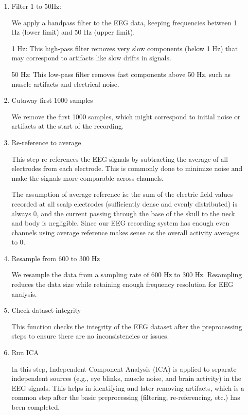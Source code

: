 \documentclass[12pt,a4paper,titlepage,openany]{report}
\begin{document}
\begin{enumerate}
    \item Filter 1 to 50Hz:
    
    We apply a bandpass filter to the EEG data, keeping frequencies between 1 Hz (lower limit) and 50 Hz (upper limit).

    1 Hz: This high-pass filter removes very slow components (below 1 Hz) that may correspond to artifacts like slow drifts in signals.

    50 Hz: This low-pass filter removes fast components above 50 Hz, such as muscle artifacts and electrical noise.

    \item Cutaway first 1000 samples

    We remove the first 1000 samples, which might correspond to initial noise or artifacts at the start of the recording. 

    \item Re-reference to average

    This step re-references the EEG signals by subtracting the average of all electrodes from each electrode. This is commonly done to minimize noise and make the signals more comparable across channels.

    The assumption of average reference is: the sum of the electric field values recorded at all scalp electrodes (sufficiently dense and evenly distributed) is always 0, and the current passing through the base of the skull to the neck and body is negligible. 
    Since our EEG recording system has enough even channels using average reference makes sense as the overall activity averages to 0.

    \item Resample from 600 to 300 Hz

    We resample the data from a sampling rate of 600 Hz to 300 Hz. Resampling reduces the data size while retaining enough frequency resolution for EEG analysis.

    \item Check dataset integrity

    This function checks the integrity of the EEG dataset after the preprocessing steps to ensure there are no inconsistencies or issues.

    \item Run ICA

    In this step, Independent Component Analysis (ICA) is applied to separate independent sources (e.g., eye blinks, muscle noise, and brain activity) in the EEG signals. This helps in identifying and later removing artifacts, which is a common step after the basic preprocessing (filtering, re-referencing, etc.) has been completed.

\end{enumerate}
\end{document}
